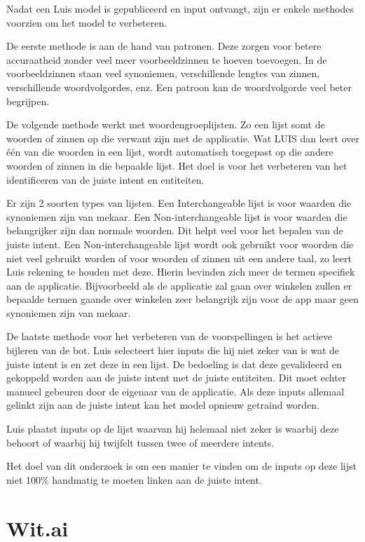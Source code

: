 Nadat een Luis model is gepubliceerd en input ontvangt, zijn er enkele methodes voorzien om het model te verbeteren.

De eerste methode is aan de hand van patronen. Deze zorgen voor betere accuraatheid zonder veel meer voorbeeldzinnen te hoeven toevoegen. In de voorbeeldzinnen staan veel synoniemen, verschillende lengtes van zinnen, verschillende woordvolgordes, enz. Een patroon kan de woordvolgorde veel beter begrijpen.

De volgende methode werkt met woordengroeplijsten. Zo een lijst somt de woorden of zinnen op die verwant zijn met de applicatie. Wat LUIS dan leert over één van die woorden in een lijst, wordt automatisch toegepast op die andere woorden of zinnen in die bepaalde lijst. Het doel is voor het verbeteren van het identificeren van de juiste intent en entiteiten.

Er zijn 2 soorten types van lijsten. Een Interchangeable lijst is voor waarden die synoniemen zijn van mekaar. Een Non-interchangeable lijst is voor waarden die belangrijker zijn dan normale woorden. Dit helpt veel voor het bepalen van de juiste intent. Een Non-interchangeable lijst wordt ook gebruikt voor woorden die niet veel gebruikt worden of voor woorden of zinnen uit een andere taal, zo leert Luis rekening te houden met deze. Hierin bevinden zich meer de termen specifiek aan de applicatie. Bijvoorbeeld als de applicatie zal gaan over winkelen zullen er bepaalde termen gaande over winkelen zeer belangrijk zijn voor de app maar geen synoniemen zijn van mekaar.

De laatste methode voor het verbeteren van de voorspellingen is het actieve bijleren van de bot. Luis selecteert hier inputs die hij niet zeker van is wat de juiste intent is en zet deze in een lijst. De bedoeling is dat deze gevalideerd en gekoppeld worden aan de juiste intent met de juiste entiteiten. Dit moet echter manueel gebeuren door de eigenaar van de applicatie. Als deze inputs allemaal gelinkt zijn aan de juiste intent kan het model opnieuw getraind worden.

Luis plaatst inputs op de lijst waarvan hij helemaal niet zeker is waarbij deze behoort of waarbij hij twijfelt tussen twee of meerdere intents.

Het doel van dit onderzoek is om een manier te vinden om de inputs op deze lijst niet 100\% handmatig te moeten linken aan de juiste intent.

\section{Wit.ai}
\label{sec:Wit.ai}

